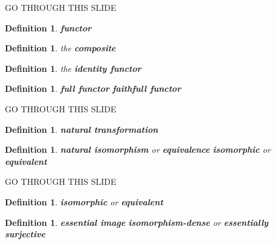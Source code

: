 \documentclass[dvipdfmx,10pt,notheorems]{beamer}
\newtheorem{definition}[theorem]{Definition}
\renewcommand{\#}{^\sharp}
\begin{document}
	
	
	\begin{frame}{GO THROUGH THIS SLIDE}
			\begin{definition}
					{\bf functor}
			\end{definition}
			\begin{definition}
					the {\bf composite}
			\end{definition}
			\begin{definition}
					the {\bf identity functor}
			\end{definition}
			\begin{definition}
					{\bf full functor}
					{\bf faithfull functor}
			\end{definition}
	\end{frame}

	
	\begin{frame}{GO THROUGH THIS SLIDE}
			\begin{definition}
					{\bf natural transformation}
			\end{definition}
			\begin{definition}
					{\bf natural isomorphism} or {\bf equivalence}
					{\bf isomorphic} or {\bf equivalent}
			\end{definition}
	\end{frame}



	\begin{frame}{GO THROUGH THIS SLIDE}
			\begin{definition}
					{\bf isomorphic} or {\bf equivalent}
			\end{definition}

			\begin{definition}
					{\bf essential image}
					{\bf isomorphism-dense} or {\bf essentially surjective}
			\end{definition}
	\end{frame}
	
	
	
\end{document}

